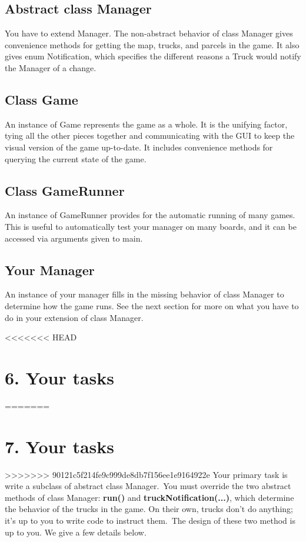 \documentclass[11pt]{article}
\begin{document}
\begin{itemize}
\subsection{Abstract class Manager}
You have to extend Manager. The non-abstract behavior of class Manager gives convenience methods for getting the map, trucks, and parcels in the game. It also gives enum Notification, which specifies the different reasons a Truck would notify the Manager of a change.
\subsection{Class Game}
An instance of Game represents the game as a whole. It is the unifying factor, tying all  the other pieces together and communicating with the GUI to keep the visual version of the game up-to-date. It includes convenience methods for querying the current state of the game.
\subsection{Class GameRunner}
An instance of GameRunner provides for the automatic running of many games. This is useful to automatically test your manager on many boards, and it can be accessed via arguments given to main.
\subsection{Your Manager}
An instance of your manager fills in the missing behavior of class Manager to determine how the game runs. See the next section for more on what you have to do in your extension of class Manager.

<<<<<<< HEAD
\section{6. Your tasks}
=======
\newpage
\section{7. Your tasks}
>>>>>>> 90121c5f214fe9c999de8db7f156ee1e9164922e
Your primary task is write a subclass of abstract class Manager.\ You must override the two abstract methods of class Manager: \textbf{run()} and \textbf{truckNotification(...)}, which determine the behavior of the trucks in the game. On their own, trucks don't do anything; it's up to you to write code to instruct them.\ The
design of these two method is up to you. We give a few details below.\\


\end{itemize}
\end{document}
